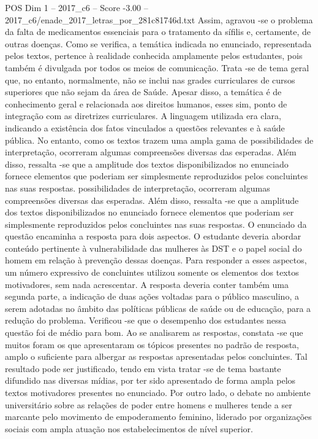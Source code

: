 \begin{textsample}{POS Dim 1 – 2017\_c6 – Score -3.00 – 2017\_c6/enade\_2017\_letras\_por\_281c81746d.txt}
Assim, agravou -se o problema da falta de medicamentos essenciais para o tratamento da sífilis e, certamente, de outras doenças.
Como se verifica, a temática indicada no enunciado, representada pelos textos, pertence à realidade conhecida amplamente pelos estudantes, pois também é divulgada por todos os meios de comunicação.
Trata -se de tema geral que, no entanto, normalmente, não se inclui nas grades curriculares de cursos superiores que não sejam da área de Saúde.
Apesar disso, a temática é de conhecimento geral e relacionada aos direitos humanos, esses sim, ponto de integração com as diretrizes curriculares.
A linguagem utilizada era clara, indicando a existência dos fatos vinculados a questões relevantes e à saúde pública.
No entanto, como os textos trazem uma ampla gama de possibilidades de interpretação, ocorreram algumas compreensões diversas das esperadas.
Além disso, ressalta -se que a amplitude dos textos disponibilizados no enunciado fornece elementos que poderiam ser simplesmente reproduzidos pelos concluintes nas suas respostas. possibilidades de interpretação, ocorreram algumas compreensões diversas das esperadas.
Além disso, ressalta -se que a amplitude dos textos disponibilizados no enunciado fornece elementos que poderiam ser simplesmente reproduzidos pelos concluintes nas suas respostas.
O enunciado da questão encaminha a resposta para dois aspectos.
O estudante deveria abordar conteúdo pertinente à vulnerabilidade das mulheres às DST e o papel social do homem em relação à prevenção dessas doenças.
Para responder a esses aspectos, um número expressivo de concluintes utilizou somente os elementos dos textos motivadores, sem nada acrescentar.
A resposta deveria conter também uma segunda parte, a indicação de duas ações voltadas para o público masculino, a serem adotadas no âmbito das políticas públicas de saúde ou de educação, para a redução do problema.
Verificou -se que o desempenho dos estudantes nessa questão foi de médio para bom.
Ao se analisarem as respostas, constata -se que muitos foram os que apresentaram os tópicos presentes no padrão de resposta, amplo o suficiente para albergar as respostas apresentadas pelos concluintes.
Tal resultado pode ser justificado, tendo em vista tratar -se de tema bastante difundido nas diversas mídias, por ter sido apresentado de forma ampla pelos textos motivadores presentes no enunciado.
Por outro lado, o debate no ambiente universitário sobre as relações de poder entre homens e mulheres tende a ser marcante pelo movimento de empoderamento feminino, liderado por organizações sociais com ampla atuação nos estabelecimentos de nível superior.

\end{textsample}
